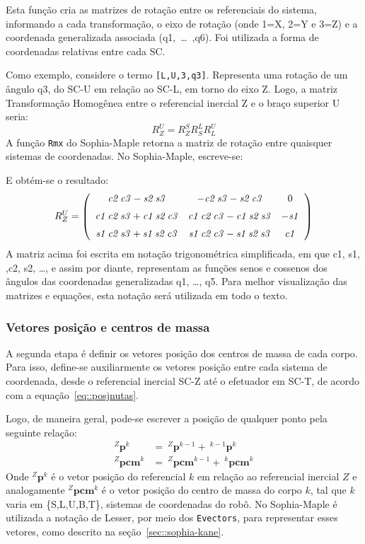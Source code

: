Esta função cria as matrizes de rotação entre os referenciais do sistema,
informando a cada transformação, o eixo de rotação
(onde 1=X, 2=Y e 3=Z) e a coordenada generalizada associada
(q1,~\ldots~,q6). Foi utilizada a forma de coordenadas relativas entre cada SC.

Como exemplo, considere o termo {\tt [L,U,3,q3]}. Representa uma rotação de um
ângulo q3, do SC-U em relação ao SC-L, em torno do eixo Z.
Logo, a matriz Transformação Homogênea entre o referencial inercial Z e o braço
superior U seria:
%
$$ R_{Z}^{U} = R_{Z}^{S} R_{S}^{L} R_{L}^{U} $$
%
A função \texttt{Rmx} do Sophia-Maple retorna a matriz de rotação entre quaisquer
sistemas de coordenadas. No Sophia-Maple, escreve-se:

\bigskip {} \bigskip 

E obtém-se o resultado:
%
$$ R_{Z}^{U} = \left( \begin {array}{ccc} {\it c2}\,{\it c3}-{\it s2}\,{\it
s3}&-{ \it c2}\,{\it s3}-{\it s2}\,{\it c3}&0\\ \noalign{\medskip}{\it c1}\,{
\it c2}\,{\it s3}+{\it c1}\,{\it s2}\,{\it c3}&{\it c1}\,{\it c2}\,{
\it c3}-{\it c1}\,{\it s2}\,{\it s3}&-{\it s1}\\ \noalign{\medskip}{
\it s1}\,{\it c2}\,{\it s3}+{\it s1}\,{\it s2}\,{\it c3}&{\it s1}\,{
\it c2}\,{\it c3}-{\it s1}\,{\it s2}\,{\it s3}&{\it c1}\end {array}
 \right) $$
 A matriz acima foi escrita em notação trigonométrica simplificada, em que c1,
 s1, ,c2, s2, \ldots, e assim por diante, representam as funções senos e
 cossenos dos ângulos das coordenadas generalizadas q1, \ldots, q5. Para melhor
 visualização das matrizes e equações, esta notação será utilizada em todo o
 texto.
 
\subsubsection{Vetores posição e centros de massa}

A segunda etapa é definir os vetores posição dos centros de massa de cada corpo.
Para isso, define-se auxiliarmente os vetores posição entre cada sistema de
coordenada, desde o referencial inercial SC-Z até o efetuador em SC-T, de
acordo com a equação~\ref{eq::posjnutas}.

Logo, de maneira geral, pode-se escrever a posição de qualquer ponto pela
seguinte relação:
%
\begin{align}
	^{Z}\mathbf{p}^{k} &= ~^{Z}\mathbf{p}^{k-1} + ~^{k-1}\mathbf{p}^{k}
	\label{eq::posjnutas} \\
	^{Z}\mathbf{pcm}^{k} &= ~^{Z}\mathbf{pcm}^{k-1} + ~^{k}\mathbf{pcm}^k
	\label{eq::pcm}
\end{align}
%
Onde $^{Z}\mathbf{p}^{k}$ é o vetor posição do referencial $k$ em relação ao
referencial inercial $Z$ e analogamente $^{Z}\mathbf{pcm}^{k}$ é o vetor
posição do centro de massa do corpo $k$, tal que $k$ varia em \{S,L,U,B,T\},
sistemas de coordenadas do robô.
No Sophia-Maple é utilizada a notação de Lesser, por meio dos \texttt{Evectors},
para representar esses vetores, como descrito na seção~\ref{sec::sophia-kane}.

